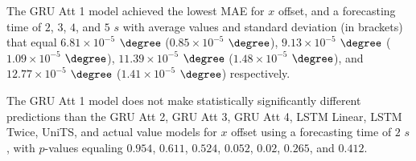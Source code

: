 \begin{table}[!ht]
	\centering
	\caption{The average MAE in $\degree$ ($\times 10^{-5}$), with standard deviation in brackets, across k-fold validation datasets for the $x$ offset estimated on the k-fold testing datasets by different RNN models, and forecasting times.}
	\label{tab:best_longitude_no_abs_MAE}
\end{table}

The GRU Att 1 model achieved the lowest MAE for $x$ offset, and a forecasting time of $2$, $3$, $4$, and $5$ $s$ with average values and standard deviation (in brackets) that equal $6.81 \times 10^{-5}$ $\degree$ ($0.85 \times 10^{-5}$ $\degree$), $9.13 \times 10^{-5}$ $\degree$ ($1.09 \times 10^{-5}$ $\degree$), $11.39 \times 10^{-5}$ $\degree$ ($1.48 \times 10^{-5}$ $\degree$), and $12.77 \times 10^{-5}$ $\degree$ ($1.41 \times 10^{-5}$ $\degree$) respectively.

The GRU Att 1 model does not make statistically significantly different predictions than the GRU Att 2, GRU Att 3, GRU Att 4, LSTM Linear, LSTM Twice, UniTS, and actual value models for $x$ offset using a forecasting time of $2$ $s$, with $p$-values equaling $0.954$, $0.611$, $0.524$, $0.052$, $0.02$, $0.265$, and $0.412$.

